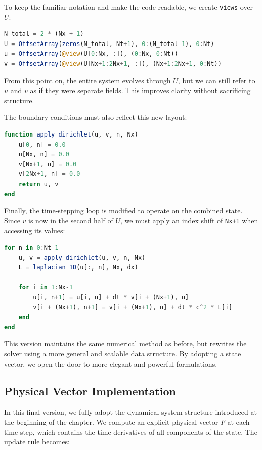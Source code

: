 To keep the familiar notation and make the code readable, we create \texttt{views} over $U$:

\begin{lstlisting}[language=Julia]
N_total = 2 * (Nx + 1)
U = OffsetArray(zeros(N_total, Nt+1), 0:(N_total-1), 0:Nt)
u = OffsetArray(@view(U[0:Nx, :]), (0:Nx, 0:Nt))
v = OffsetArray(@view(U[Nx+1:2Nx+1, :]), (Nx+1:2Nx+1, 0:Nt))
\end{lstlisting}

From this point on, the entire system evolves through $U$, but we can still refer to $u$ and $v$ as if they were separate fields. This improves clarity without sacrificing structure.

The boundary conditions must also reflect this new layout:

\begin{lstlisting}[language=Julia]
function apply_dirichlet(u, v, n, Nx)
    u[0, n] = 0.0
    u[Nx, n] = 0.0
    v[Nx+1, n] = 0.0
    v[2Nx+1, n] = 0.0
    return u, v
end
\end{lstlisting}

Finally, the time-stepping loop is modified to operate on the combined state. Since $v$ is now in the second half of $U$, we must apply an index shift of \texttt{Nx+1} when accessing its values:

\begin{lstlisting}[language=Julia]
for n in 0:Nt-1
    u, v = apply_dirichlet(u, v, n, Nx)
    L = laplacian_1D(u[:, n], Nx, dx)

    for i in 1:Nx-1
        u[i, n+1] = u[i, n] + dt * v[i + (Nx+1), n]
        v[i + (Nx+1), n+1] = v[i + (Nx+1), n] + dt * c^2 * L[i]
    end
end
\end{lstlisting}


This version maintains the same numerical method as before, but rewrites the solver using a more general and scalable data structure. By adopting a state vector, we open the door to more elegant and powerful formulations.

\subsection{Physical Vector Implementation}

In this final version, we fully adopt the dynamical system structure introduced at the beginning of the chapter. We compute an explicit physical vector $F$ at each time step, which contains the time derivatives of all components of the state. The update rule becomes:

